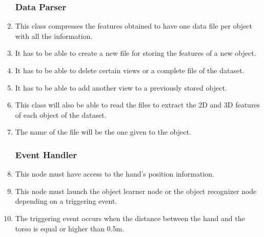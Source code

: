 \begin{enumerate}[label=\textbf{FR\threedigits*}, leftmargin=2cm]
\subsubsection{Data Parser}
\item This class compresses the features obtained to have one data file per object with all the information.
 
\item It has to be able to create a new file for storing the features of a new object. 
\item It has to be able to delete certain views or a complete file of the dataset. 
\item It has to be able to add another view to a previously stored object. 

\item This class will also be able to read the files to extract the 2D and 3D features of each object of the dataset. 

\item The name of the file will be the one given to the object. 

			
		
	


 
\subsubsection{Event Handler}
\item This node must have access to the hand's position information. 
\item This node must launch the object learner node or the object recognizer node depending on a triggering event. 
\item The triggering event occurs when the distance between the hand and the torso is equal or higher than 0.5m.   
 


\end{enumerate}

